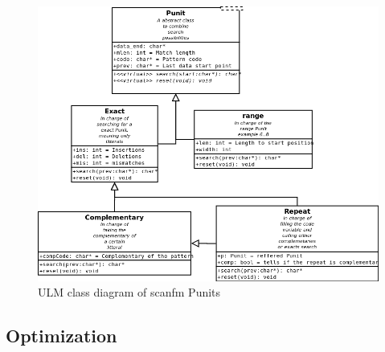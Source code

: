 \documentclass[12pt]{article}
\begin{document}
\begin{figure}[h!]
\includegraphics[scale=0.6]{UML.png}
\caption{ULM class diagram of scanfm Punits}
\end{figure}

\subsection{Optimization}
\end{document}
